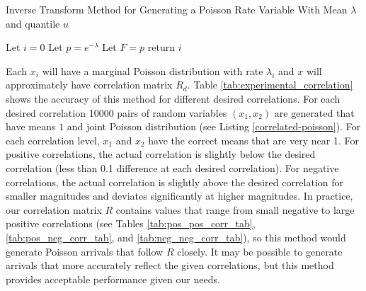 \begin{algorithm}[H]
\SetAlgoLined
\caption{Inverse Transform Method for Generating a Poisson Rate Variable With Mean $\lambda$ and quantile $u$}
 Let $i = 0$\;
 Let $p = e^{-\lambda}$\;
 Let $F = p$\;
 return $i$ \;
\end{algorithm}

Each $x_i$ will have a marginal Poisson distribution with rate $\lambda_i$ and $x$ will approximately have correlation matrix $R_d$. Table \ref{tab:experimental_correlation} shows the accuracy of this method for different desired correlations. For each desired correlation 10000 pairs of random variables $(x_1,x_2)$ are generated that have means $1$ and joint Poisson distribution (see Listing \ref{correlated-poisson}). For each correlation level, $x_1$ and $x_2$ have the correct means that are very near 1. For positive correlations, the actual correlation is slightly below the desired correlation (less than 0.1 difference at each desired correlation). For negative correlations, the actual correlation is slightly above the desired correlation for smaller magnitudes and deviates significantly at higher magnitudes. In practice, our correlation matrix $R$ contains values that range from small negative to large positive correlations (see Tables \ref{tab:pos_pos_corr_tab}, \ref{tab:pos_neg_corr_tab}, and \ref{tab:neg_neg_corr_tab}), so this method would generate Poisson arrivals that follow $R$ closely. It may be possible to generate arrivals that more accurately reflect the given correlations, but this method provides acceptable performance given our needs.

